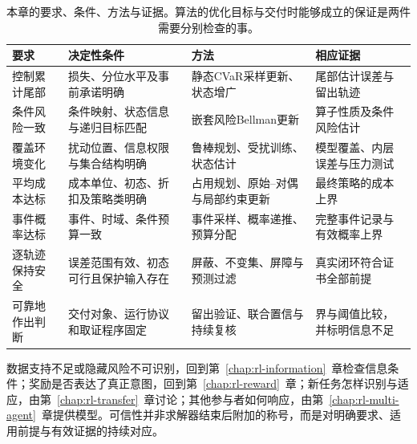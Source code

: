 \begin{table}[t]
  \centering
  \begin{tabularx}{\linewidth}{@{}>{\raggedright\arraybackslash}p{22mm}XXX@{}}
    \toprule
    要求 & 决定性条件 & 方法 & 相应证据 \\
    \midrule
    控制累计尾部 & 损失、分位水平及事前承诺明确 & 静态CVaR采样更新、状态增广 & 尾部估计误差与留出轨迹 \\
    条件风险一致 & 条件映射、状态信息与递归目标匹配 & 嵌套风险Bellman更新 & 算子性质及条件风险估计 \\
    覆盖环境变化 & 扰动位置、信息权限与集合结构明确 & 鲁棒规划、受扰训练、状态估计 & 模型覆盖、内层误差与压力测试 \\
    平均成本达标 & 成本单位、初态、折扣及策略类明确 & 占用规划、原始--对偶与局部约束更新 & 最终策略的成本上界 \\
    事件概率达标 & 事件、时域、条件预算一致 & 事件采样、概率递推、预算分配 & 完整事件记录与有效概率上界 \\
    逐轨迹保持安全 & 误差范围有效、初态可行且保护输入存在 & 屏蔽、不变集、屏障与预测过滤 & 真实闭环符合证书全部前提 \\
    可靠地作出判断 & 交付对象、运行协议和取证程序固定 & 留出验证、联合置信与持续复核 & 界与阈值比较，并标明信息不足 \\
    \bottomrule
  \end{tabularx}
  \caption{本章的要求、条件、方法与证据。算法的优化目标与交付时能够成立的保证是两件需要分别检查的事。}
  \label{tab:rl-trustworthy-summary}
\end{table}

数据支持不足或隐藏风险不可识别，回到第~\ref{chap:rl-information}~章检查信息条件；奖励是否表达了真正意图，回到第~\ref{chap:rl-reward}~章；新任务怎样识别与适应，由第~\ref{chap:rl-transfer}~章讨论；其他参与者如何响应，由第~\ref{chap:rl-multi-agent}~章提供模型。可信性并非求解器结束后附加的称号，而是对明确要求、适用前提与有效证据的持续对应。
